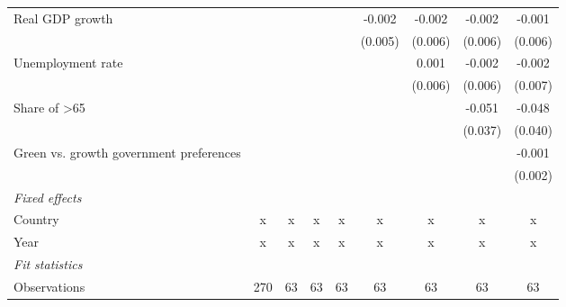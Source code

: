 \begin{table}[htbp]
\begin{tabular}{lcccccccc}
      Real GDP growth                                                                   &         &         &               &               & -0.002        & -0.002        & -0.002        & -0.001\\   
                                                                                        &         &         &               &               & (0.005)       & (0.006)       & (0.006)       & (0.006)\\   
      Unemployment rate                                                                 &         &         &               &               &               & 0.001         & -0.002        & -0.002\\   
                                                                                        &         &         &               &               &               & (0.006)       & (0.006)       & (0.007)\\   
      Share of >65                                                                      &         &         &               &               &               &               & -0.051        & -0.048\\   
                                                                                        &         &         &               &               &               &               & (0.037)       & (0.040)\\   
      Green vs. growth government preferences                                           &         &         &               &               &               &               &               & -0.001\\   
                                                                                        &         &         &               &               &               &               &               & (0.002)\\   
      \emph{Fixed effects}\\
      Country                                                                           & x       & x       & x             & x             & x             & x             & x             & x\\  
      Year                                                                              & x       & x       & x             & x             & x             & x             & x             & x\\  
      \midrule \emph{Fit statistics}\\
      Observations                                                                      & 270     & 63      & 63            & 63            & 63            & 63            & 63            & 63\\  

\end{tabular}
\end{table}
